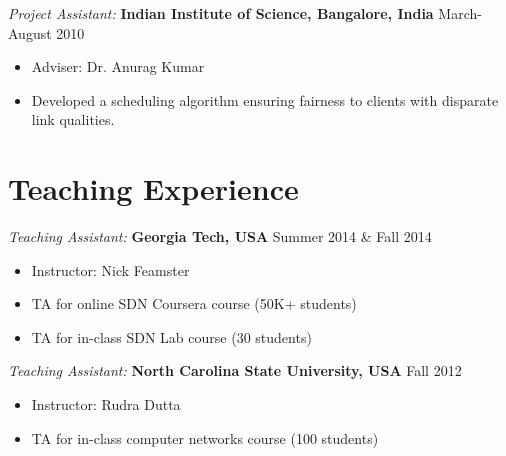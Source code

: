 \documentclass[11pt]{res}
\begin{document}
\begin{resume}
{\sl Project Assistant: } \textbf{Indian Institute of Science, Bangalore, India} \hfill March-August 2010
\begin{itemize} \itemsep -2pt %
\item Adviser: Dr. Anurag Kumar
\item Developed a scheduling algorithm ensuring fairness to clients with disparate link qualities. 
\end{itemize}

\section{{Teaching Experience}}

{\sl Teaching Assistant: } \textbf{Georgia Tech, USA} \hfill Summer 2014 \& Fall 2014
\begin{itemize} \itemsep -2pt %
\item Instructor: Nick Feamster
\item TA for online SDN Coursera course (50K+ students) 
\item TA for in-class SDN Lab course (30 students)
\end{itemize}

{\sl Teaching Assistant: } \textbf{North Carolina State University, USA} \hfill Fall 2012
\begin{itemize} \itemsep -2pt %
\item Instructor: Rudra Dutta
\item TA for in-class computer networks course (100 students)
\end{itemize}





\end{resume}
\end{document}
